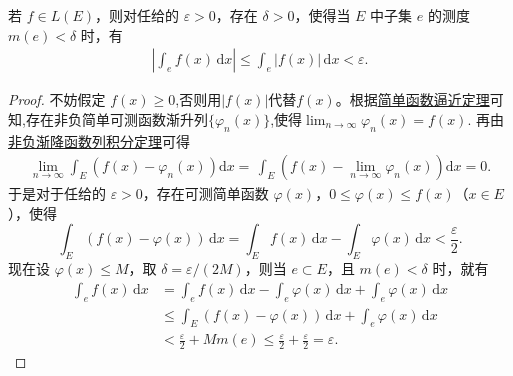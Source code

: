 \documentclass[../../main.tex]{subfiles}
\begin{document}
\begin{theorem}[积分的绝对连续性]\label{theorem:积分的绝对连续性}
若 $f \in L(E)$，则对任给的 $\varepsilon > 0$，存在 $\delta > 0$，使得当 $E$ 中子集 $e$ 的测度 $m(e) < \delta$ 时，有
\begin{align*}
\left| \int_e f(x) \, \mathrm{d}x \right| \leqslant \int_e |f(x)| \, \mathrm{d}x < \varepsilon.
\end{align*}
\end{theorem}
\begin{proof}
不妨假定 $f(x) \geqslant 0$,否则用$|f(x)|$代替$f(x)$。根据\hyperref[theorem:简单函数逼近定理]{简单函数逼近定理}可知,存在非负简单可测函数渐升列$\{\varphi_n(x)\}$,使得$\lim_{n\to \infty}\varphi_n(x)=f(x).$
再由\hyperref[corollary:非负渐降函数列积分定理]{非负渐降函数列积分定理}可得
\begin{align*}
\underset{n\rightarrow \infty}{\lim}\int_E{\left( f\left( x \right) -\varphi _n\left( x \right) \right) \mathrm{d}x}=\,\int_E{\left( f\left( x \right) -\underset{n\rightarrow \infty}{\lim}\varphi _n\left( x \right) \right) \mathrm{d}x}=0.
\end{align*}
于是对于任给的 $\varepsilon > 0$，存在可测简单函数 $\varphi(x)$，$0 \leqslant \varphi(x) \leqslant f(x)$（$x \in E$），使得
\[
\int_E (f(x) - \varphi(x)) \, \mathrm{d}x = \int_E f(x) \, \mathrm{d}x - \int_E \varphi(x) \, \mathrm{d}x < \frac{\varepsilon}{2}.
\]
现在设 $\varphi(x) \leqslant M$，取 $\delta = \varepsilon / (2M)$，则当 $e \subset E$，且 $m(e) < \delta$ 时，就有
\begin{align*}
\int_e f(x) \, \mathrm{d}x &= \int_e f(x) \, \mathrm{d}x - \int_e \varphi(x) \, \mathrm{d}x + \int_e \varphi(x) \, \mathrm{d}x \\
&\leqslant \int_E (f(x) - \varphi(x)) \, \mathrm{d}x + \int_e \varphi(x) \, \mathrm{d}x \\
&< \frac{\varepsilon}{2} + Mm(e) \leqslant \frac{\varepsilon}{2} + \frac{\varepsilon}{2} = \varepsilon.
\end{align*}
\end{proof}
\end{document}
